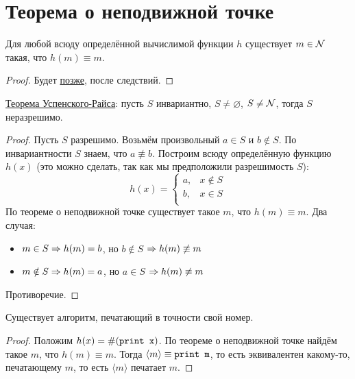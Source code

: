 \section{Теорема о неподвижной точке}

\begin{theorem}\label{fixedPoint}
	Для любой всюду определённой вычислимой функции $h$ существует $m \in \mathcal{N}$ такая, что $h(m) \equiv m$.
\end{theorem}
\begin{proof}
	Будет \href{fixedPointProof}{позже}, после следствий.
\end{proof}

\begin{conseq}
	\href{UspenskyRice}{Теорема Успенского-Райса}:
	пусть $S$ инвариантно, $S \ne \varnothing$, $S \ne \mathcal{N}$, тогда $S$ неразрешимо.
\end{conseq}
\begin{proof}
	Пусть $S$ разрешимо.
	Возьмём произвольный $a \in S$ и $b \notin S$.
	По инвариантности $S$ знаем, что $a \not\equiv b$.
	Построим всюду определённую функцию $h(x)$ (это можно сделать, так как мы предположили разрешимость $S$):
	\[
		h(x) =
		\begin{cases}
			a, &x \notin S \\
			b, &x \in S \\
		\end{cases}
	\]
	По теореме о неподвижной точке существует такое $m$, что $h(m) \equiv m$.
	Два случая:
	\begin{itemize}
		\item
			$m \in S \Rightarrow h(m) = b$, но $b \notin S$ $\Rightarrow h(m) \not\equiv m$
		\item
			$m \notin S \Rightarrow h(m) = a$, но $a \in S$ $\Rightarrow h(m) \not\equiv m$
	\end{itemize}
	Противоречие.
\end{proof}

\begin{conseq}
	Существует алгоритм, печатающий в точности свой номер.
\end{conseq}
\begin{proof}
	Положим $h(x) = \#(\texttt{print x})$.
	По теореме о неподвижной точке найдём такое $m$, что $h(m) \equiv m$.
	Тогда $\langle m \rangle \equiv \texttt{print m}$, то есть эквивалентен какому-то, печатающему $m$, то есть $\langle m \rangle$ печатает $m$.
\end{proof}

